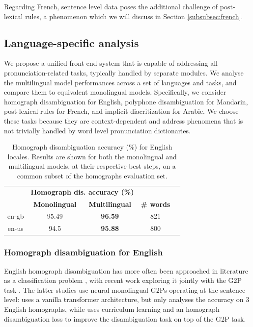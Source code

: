 Regarding French, sentence level data poses the additional challenge of post-lexical rules, a phenomenon which we will discuss in Section \ref{subsubsec:french}.


\subsection{Language-specific analysis}
\label{subsec:analysis}
We propose a unified front-end system that is capable of addressing all pronunciation-related tasks, typically handled by separate modules. We analyse the multilingual model performances across a set of languages and tasks, and compare them to equivalent monolingual models. 
Specifically, we consider homograph disambiguation for English, polyphone disambiguation for Mandarin, post-lexical rules for French, and implicit diacritization for Arabic.
We choose these tasks because they are context-dependent and address phenomena that is not trivially handled by word level pronunciation dictionaries.


\begin{table}[t]
\centering
\begin{tabular}{ccccc}

\hline
 &

\multicolumn{2}{c}{\textbf{Homograph dis. accuracy (\%)}} \\
 &
\textbf{Monolingual} &
\textbf{Multilingual}

&
\textbf{\# words}
\\

\hline

en-gb &  
95.49 &
\textbf{96.59} &
821
\\

en-us & 
94.5 &
\textbf{95.88} &
800
\\
\hline

\end{tabular}
\caption{Homograph disambiguation  accuracy (\%) for English locales. Results are shown for both the monolingual and multilingual models, at their respective best steps, on a common subset of the homographs evaluation set.}
\label{table:english}
\end{table}


\subsubsection{Homograph disambiguation for English}
\label{subsubsec:english}
English homograph disambiguation has more often been approached in literature as a classification problem \cite{gorman-etal-2018-improving, nicolis21_ssw}, with recent work exploring it jointly with the G2P task \cite{T5G2P_21, soundchoice22}. The latter studies use neural monolingual G2Ps operating at the sentence level: \cite{T5G2P_21} uses a vanilla transformer architecture, but only analyses the accuracy on 3 English homographs, while \cite{soundchoice22} uses curriculum learning and an homograph disambiguation loss to improve the disambiguation task on top of the G2P task.

